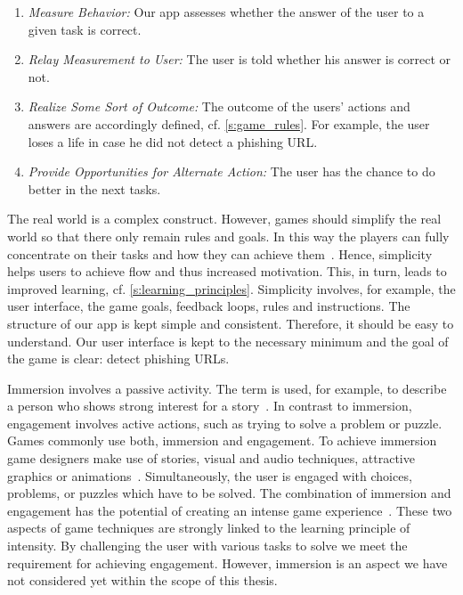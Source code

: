 \begin{description}[leftmargin=0cm]
\begin{enumerate}
	\item \textit{Measure Behavior:} Our app assesses whether the answer of the user to a given task is correct.
	\item \textit{Relay Measurement to User:} The user is told whether his answer is correct or not.
	\item \textit{Realize Some Sort of Outcome:} The outcome of the users' actions and answers are accordingly defined, cf. \autoref{s:game_rules}. 
For example, the user loses a life in case he did not detect a phishing URL.
	\item \textit{Provide Opportunities for Alternate Action:} 
The user has the chance to do better in the next tasks.
\end{enumerate}
	\item[Simplicity:] The real world is a complex construct.
However, games should simplify the real world so that there only remain rules and goals.
In this way the players can fully concentrate on their tasks and how they can achieve them~\cite{csikszentmihalyi1997finding}.
Hence, simplicity helps users to achieve flow and thus increased motivation. 
This, in turn, leads to improved learning, cf. \autoref{s:learning_principles}.
Simplicity involves, for example, the user interface, the game goals, feedback loops, rules and instructions.
The structure of our app is kept simple and consistent.
Therefore, it should be easy to understand.
Our user interface is kept to the necessary minimum and the goal of the game is clear: detect phishing URLs.
	\item[Immersion and Engagement:] Immersion involves a passive activity. 
The term is used, for example, to describe a person who shows strong interest for a story~\cite{mcmahan2003immersion}. 
In contrast to immersion, engagement involves active actions, such as trying to solve a problem or puzzle.
Games commonly use both, immersion and engagement.
To achieve immersion game designers make use of stories, visual and audio techniques, attractive graphics or animations~\cite{schell2008art}.
Simultaneously, the user is engaged with choices, problems, or puzzles which have to be solved.
The combination of immersion and engagement has the potential of creating an intense game experience~\cite{murphy2011games}.
These two aspects of game techniques are strongly linked to the learning principle of intensity.
By challenging the user with various tasks to solve we meet the requirement for achieving engagement. 
However, immersion is an aspect we have not considered yet within the scope of this thesis.

\end{description}
